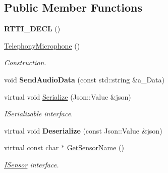 \subsection*{Public Member Functions}
\begin{DoxyCompactItemize}
\item 
\mbox{\label{class_telephony_microphone_ae8460fca8fd281cab3ec131ab6b1124e}} 
{\bfseries R\+T\+T\+I\+\_\+\+D\+E\+CL} ()
\item 
\mbox{\label{class_telephony_microphone_a03dc0272d5adf7f321cb7b8e77aed0b8}} 
\hyperlink{class_telephony_microphone_a03dc0272d5adf7f321cb7b8e77aed0b8}{Telephony\+Microphone} ()
\begin{DoxyCompactList}\small\item\em Construction. \end{DoxyCompactList}\item 
\mbox{\label{class_telephony_microphone_ac91d451ec8941c4c00031a508a767cfd}} 
void {\bfseries Send\+Audio\+Data} (const std\+::string \&a\+\_\+\+Data)
\item 
\mbox{\label{class_telephony_microphone_a3ba8e7fa57608d44cb27a11599c479ad}} 
virtual void \hyperlink{class_telephony_microphone_a3ba8e7fa57608d44cb27a11599c479ad}{Serialize} (Json\+::\+Value \&json)
\begin{DoxyCompactList}\small\item\em I\+Serializable interface. \end{DoxyCompactList}\item 
\mbox{\label{class_telephony_microphone_a58296ed3c456176013c12ddc5b78455e}} 
virtual void {\bfseries Deserialize} (const Json\+::\+Value \&json)
\item 
\mbox{\label{class_telephony_microphone_a5ee9a5904409d8bb4c35b17196b585e0}} 
virtual const char $\ast$ \hyperlink{class_telephony_microphone_a5ee9a5904409d8bb4c35b17196b585e0}{Get\+Sensor\+Name} ()
\begin{DoxyCompactList}\small\item\em \hyperlink{class_i_sensor}{I\+Sensor} interface. \end{DoxyCompactList}\item 

\end{DoxyCompactItemize}
